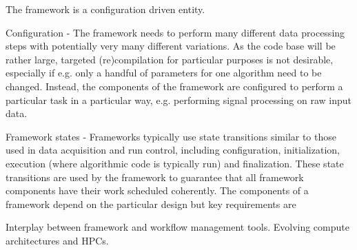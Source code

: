 \documentclass[../main-v1.tex]{subfiles}
\begin{document}
The framework is a configuration driven entity.  





Configuration - The framework needs to perform many different data processing steps with potentially very many different variations.  As the code base will be rather large, targeted (re)compilation for particular purposes is not desirable, especially if e.g. only a handful of parameters for one algorithm need to be changed.  Instead, the components of the framework are configured to perform a particular task in a particular way, e.g. performing signal processing on raw input data.  

Framework states - Frameworks typically use state transitions similar to those used in data acquisition and run control, including configuration, initialization, execution (where algorithmic code is typically run) and finalization.  These state transitions are used by the framework to guarantee that all framework components have their work scheduled coherently.  The components of a framework depend on the particular design but key requirements are




Interplay between framework and workflow management tools.  Evolving compute architectures and HPCs.
\end{document}
